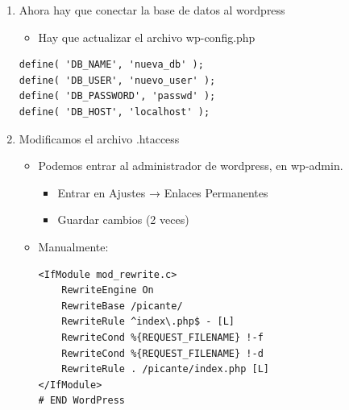 \documentclass[11pt]{article}
\begin{document}
\begin{enumerate}
\begin{verbatim}
GRANT ALL PRIVILEGES ON nueva_db.* TO 'nuevo_user'@'localhost';
FLUSH PRIVILEGES;
\end{verbatim}

\begin{itemize}
\item Importamos la base de datos a la nueva es importante que el sql esté modificado con los dominios nuevos

\begin{verbatim}
mysql -u nuevo_user -p nueva_db < dump.sql
\end{verbatim}

\item Comprobamos que existan las tablas, dentro de mariadb

\begin{verbatim}
USE nueva_db;
SHOW TABLES;
\end{verbatim}
\end{itemize}

\item Ahora hay que conectar la base de datos al wordpress

\begin{itemize}
\item Hay que actualizar el archivo wp-config.php
\end{itemize}

\begin{verbatim}
define( 'DB_NAME', 'nueva_db' );
define( 'DB_USER', 'nuevo_user' );
define( 'DB_PASSWORD', 'passwd' );
define( 'DB_HOST', 'localhost' );
\end{verbatim}

\item Modificamos el archivo .htaccess

\begin{itemize}
\item Podemos entrar al administrador de wordpress, en wp-admin.
\begin{itemize}
\item Entrar en Ajustes → Enlaces Permanentes
\item Guardar cambios (2 veces)
\end{itemize}

\item Manualmente:

\begin{verbatim}
<IfModule mod_rewrite.c>
    RewriteEngine On
    RewriteBase /picante/
    RewriteRule ^index\.php$ - [L]
    RewriteCond %{REQUEST_FILENAME} !-f
    RewriteCond %{REQUEST_FILENAME} !-d
    RewriteRule . /picante/index.php [L]
</IfModule>
# END WordPress
\end{verbatim}


\end{itemize}
\end{enumerate}
\end{document}
